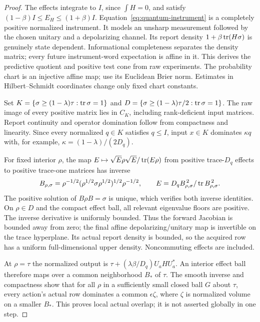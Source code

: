 \begin{proof}
The effects integrate to $I$, since $\int H=0$, and satisfy
$(1-\beta)I\le E_H\le(1+\beta)I$. Equation~\eqref{eq:quantum-instrument} is a completely positive normalized instrument. It models an unsharp measurement followed by the chosen unitary and a depolarizing channel. Its report density $1+\beta\operatorname{tr}(H\sigma)$ is genuinely state dependent. Informational completeness separates the density matrix; every future instrument-word expectation is affine in it. This derives the predictive quotient and positive test cone from raw experiments. The probability chart is an injective affine map; use its Euclidean Brier norm. Estimates in Hilbert--Schmidt coordinates change only fixed chart constants.

Set $K=\{\sigma\ge(1-\lambda)\tau:\operatorname{tr}\sigma=1\}$ and
$D=\{\sigma\ge(1-\lambda)\tau/2:\operatorname{tr}\sigma=1\}$. The raw image of every positive matrix lies in $C_K$, including rank-deficient input matrices. Report continuity and operator domination follow from compactness and linearity. Since every normalized $q\in K$ satisfies $q\le I$, input $x\in K$ dominates $\kappa q$ with, for example, $\kappa=(1-\lambda)/(2D_q)$.

For fixed interior $\rho$, the map
$E\mapsto\sqrt E\rho\sqrt E/\operatorname{tr}(E\rho)$ from positive trace-$D_q$ effects to positive trace-one matrices has inverse
\[
 B_{\rho,\sigma}=\rho^{-1/2}(\rho^{1/2}\sigma\rho^{1/2})^{1/2}\rho^{-1/2},
 \qquad E=D_q B_{\rho,\sigma}^{\,2}/\operatorname{tr} B_{\rho,\sigma}^{\,2}.
\]
The positive solution of $B\rho B=\sigma$ is unique, which verifies both inverse identities. On $\rho\in D$ and the compact effect ball, all relevant eigenvalue floors are positive. The inverse derivative is uniformly bounded. Thus the forward Jacobian is bounded away from zero; the final affine depolarizing/unitary map is invertible on the trace hyperplane. Its actual report density is bounded, so the acquired row has a uniform full-dimensional upper density. Noncommuting effects are included.

At $\rho=\tau$ the normalized output is
$\tau+(\lambda\beta/D_q)U_aHU_a^*$. An interior effect ball therefore maps over a common neighborhood $B_*$ of $\tau$. The smooth inverse and compactness show that for all $\rho$ in a sufficiently small closed ball $G$ about $\tau$, every action's actual row dominates a common $\epsilon\zeta$, where $\zeta$ is normalized volume on a smaller $B_*$. This proves local actual overlap; it is not asserted globally in one step.


\end{proof}
